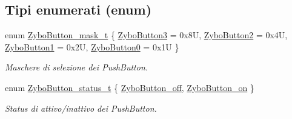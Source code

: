 \subsection*{Tipi enumerati (enum)}
\begin{DoxyCompactItemize}
\item 
enum \hyperlink{group___button_ga4d26a5f6cad606de534ba034e0ba42dd}{Zybo\+Button\+\_\+mask\+\_\+t} \{ \hyperlink{group___button_gga4d26a5f6cad606de534ba034e0ba42ddaabede392be8cae14b8a070a804c754e8}{Zybo\+Button3} = 0x8\+U, 
\hyperlink{group___button_gga4d26a5f6cad606de534ba034e0ba42dda2aa888c8f01ac8a79013e5ebc9eef609}{Zybo\+Button2} = 0x4\+U, 
\hyperlink{group___button_gga4d26a5f6cad606de534ba034e0ba42dda29c35ef3133898c050f675a60de66dd7}{Zybo\+Button1} = 0x2\+U, 
\hyperlink{group___button_gga4d26a5f6cad606de534ba034e0ba42dda2f821ce9661687aefb0ec4de65911570}{Zybo\+Button0} = 0x1\+U
 \}
\begin{DoxyCompactList}\small\item\em Maschere di selezione dei Push\+Button. \end{DoxyCompactList}\item 
enum \hyperlink{group___button_ga85c290bfa232cab213e69200bf78e06a}{Zybo\+Button\+\_\+status\+\_\+t} \{ \hyperlink{group___button_gga85c290bfa232cab213e69200bf78e06aacd110f28912806bcec929721e8737399}{Zybo\+Button\+\_\+off}, 
\hyperlink{group___button_gga85c290bfa232cab213e69200bf78e06aa49bf4a6902270f28bc6a1146fbd1b1fe}{Zybo\+Button\+\_\+on}
 \}
\begin{DoxyCompactList}\small\item\em Status di attivo/inattivo dei Push\+Button. \end{DoxyCompactList}\end{DoxyCompactItemize}
